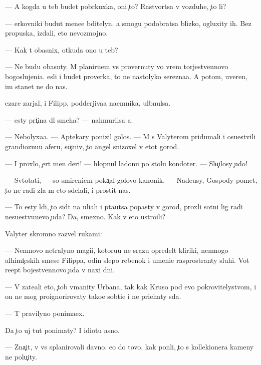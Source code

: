 \documentclass[10pt]{book}
\begin{document}
— A kogda u teb{\ia} budet pobr{\ia}kuxka, oni {\c}to? Rastvor{\ia}tsa v vozduhe, {\c}to li?

— {\Q}erkovniki budut mene{\y}e bditelyn{\yi}. {\Y}a smogu podobratsa blizko, ogluxity ih. Bez propuska, izdali, eto nevozmojno.

— Kak t{\yi} ob{\y}asnix, otkuda ono u teb{\ia}?

— Ne budu ob{\y}asn{\ia}ty. M{\yi} planiru{\y}em vs{\e} provernuty vo vrem{\ia} torjestvennovo bogoslujeni{\y}a. {\Y}esli i budet proverka, to ne nastolyko ser{\y}ezna{\y}a. A potom, uveren, im stanet ne do nas.

{\C}ezare zarjal, i Filipp, podderjiva{\y}a na{\y}emnika, ul{\yi}bnulsa.

— {\Y}esty pri{\c}ina dl{\ia} smeha? — nahmurilsa {\y}a.

— Nebolyxa{\y}a. — Aptekary ponizil golos. — M{\yi} s Valyterom pridumali i osu{\x}estvili grandioznu{\y}u aferu, so{\c}iniv, {\c}to angel snizoxel v etot gorod.

— I proxlo, {\c}ert men{\ia} deri! — hlopnul ladon{\y}u po stolu kondot{\y}er. — Slu{\c}ilosy {\c}udo!

— Sv{\ia}totat{\q}i, — so smireni{\y}em poka{\c}al golovo{\y} kanonik. — Nade{\y}usy, Gospody po{\y}met, {\c}to ne radi zla m{\yi} eto sdelali, i prostit nas.

— To {\y}esty l{\iu}di, {\c}to sid{\ia}t na uli{\q}ah i p{\yi}ta{\y}utsa popasty v gorod, proxli sotni lig radi nesu{\x}estvu{\y}u{\x}evo {\c}uda? Da, smexno. Kak v{\yi} eto ustro{\y}ili?

Valyter skromno razvel rukami:

— Nemnovo ne{\y}tralyno{\y} magi{\y}i, kotoru{\y}u ne srazu opredel{\ia}t kliriki, nemnogo alhimi{\c}eskih smese{\y} Filippa, odin slepo{\y} rebenok i umeni{\y}e rasprostran{\ia}ty sluhi. Vot re{\q}ept bojestvennovo {\c}uda v naxi dni.

— V{\yi} zate{\y}ali eto, {\c}tob{\yi} v{\yi}manity Urbana, tak kak Kruso pod {\y}evo pokrovitelystvom, i on ne mog proignorirovaty tako{\y}e sob{\yi}ti{\y}e i ne pri{\y}ehaty s{\iu}da.

— T{\yi} pravilyno ponima{\y}ex.

Da {\c}to uj tut ponimaty? I idiotu {\y}asno.

— Zna{\c}it, v{\yi} vs{\e} splanirovali davno. {\y}e{\x}o do tovo, kak pon{\ia}li, {\c}to s kollek{\q}ionera kameny ne polu{\c}ity.
\end{document}
